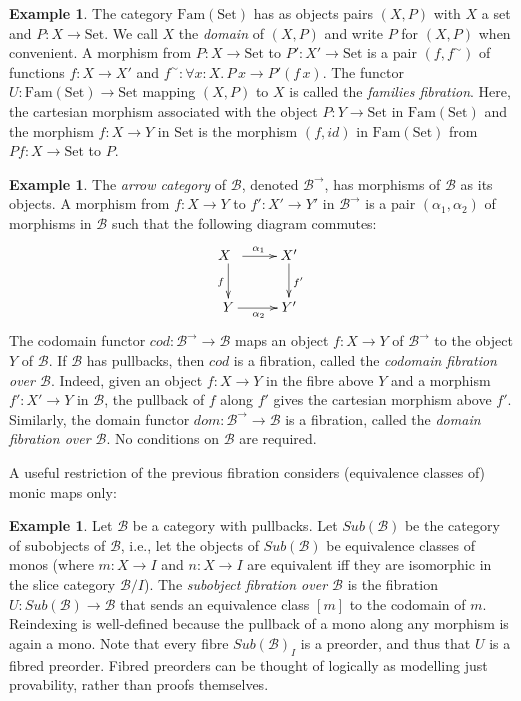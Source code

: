 \documentclass{LMCS}
\newcommand{\ra}{\rightarrow}
\newcommand{\Set}{\mbox{Set}}
\newcommand{\Fam}{\mbox{Fam}}
\newcommand\B{{\mathcal B}}
\theoremstyle{plain}
\theoremstyle{remark}
\theoremstyle{definition}
\newtheorem{example}[theorem]{Example}
\begin{document}
\begin{example}\label{ex:famfib}
  The category $\Fam(\Set)$ has as objects pairs $(X, P)$ with $X$ a
  set and $P : X \ra \Set$. We call $X$ the {\em domain} of $(X,P)$
  and write $P$ for $(X,P)$ when convenient. A morphism from $P : X
  \ra \Set$ to $P' : X' \ra \Set$ is a pair $(f,f^\sim)$ of functions
  $f:X \rightarrow X'$ and $f^\sim:\forall x : X.\, P \,x \rightarrow
  P' (f \,x)$. The functor $U:\Fam(\Set) \ra \Set$ mapping $(X, P)$ to
  $X$ is called the {\em families fibration}. Here, the cartesian
  morphism associated with the object $P:Y \ra \Set$ in $\Fam(\Set)$
  and the morphism $f:X \ra Y$ in $\Set$ is the morphism $(f, id)$
  in $\Fam(\Set)$ from $P f : X \ra \Set$ to $P$.

\end{example}
\begin{example}\label{ex:cod}
  The {\em arrow category} of $\B$, denoted $\B^\to$, has morphisms of
  $\B$ as its objects. A morphism from $f:X\to Y$ to $f':X'\to Y'$ in
  $\B^\to$ is a pair $(\alpha_1, \alpha_2)$ of morphisms in $\B$ such
  that the following diagram commutes:
\[ \xymatrix{ X \;\; \ar[r]^{\alpha_1} \ar[d]_{f} &
    X' \ar[d]^{f'} \\
    Y \ar[r]_{\alpha_2} & Y'}
\]
\noindent
  The codomain functor $\mathit{cod} : \B^{\ra} \ra \B$ maps an object
  $f:X \ra Y$ of $\B^{\ra}$ to the object $Y$ of $\B$. If $\B$ has
  pullbacks, then $\mathit{cod}$ is a fibration, called the {\em
    codomain fibration over $\B$}. Indeed, given an object $f : X \to
  Y$ in the fibre above $Y$ and a morphism $f':X' \ra Y$ in $\B$, the
  pullback of $f$ along $f'$ gives the cartesian morphism above $f'$.
  Similarly, the domain functor $\mathit{dom} : \B^{\ra} \ra \B$ is a
  fibration, called the {\em domain fibration over $\B$}. No
  conditions on $\B$ are required.
\end{example}

A useful restriction of the previous fibration considers (equivalence
classes of) monic maps only:

\begin{example} 
\label{ex:subfib}
Let $\B$ be a category with pullbacks. Let $Sub(\B)$ be the category
of subobjects of $\B$, i.e., let the objects of $Sub(\B)$ be
equivalence classes of monos (where $m : X \rightarrow I$ and $n : X
\rightarrow I$ are equivalent iff they are isomorphic in the slice
category $\B/I$). The {\em subobject fibration over $\B$} is the
fibration $U : Sub(\B) \rightarrow \B$ that sends an equivalence class
$[m]$ to the codomain of $m$. Reindexing is well-defined because the
pullback of a mono along any morphism is again a mono. Note that every
fibre $Sub(\B)_I$ is a preorder, and thus that $U$ is a fibred
preorder. Fibred preorders can be thought of logically as modelling
just provability, rather than proofs themselves.
\end{example}
\end{document}
